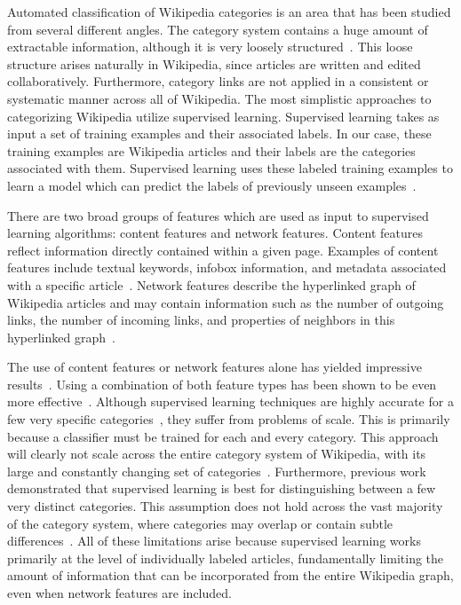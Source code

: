\documentclass[]{sig-alternate}
\begin{document}
Automated classification of Wikipedia categories is an area that has been studied from several different angles. The category system contains a huge amount of extractable information, although it is very loosely structured~\cite{Ponzetto,Strube}. This loose structure arises naturally in Wikipedia, since articles are written and edited collaboratively. Furthermore, category links are not applied in a consistent or systematic manner across all of Wikipedia. The most simplistic approaches to categorizing Wikipedia utilize supervised learning. Supervised learning takes as input a set of training examples and their associated labels. In our case, these training examples are Wikipedia articles and their labels are the categories associated with them. Supervised learning uses these labeled training examples to learn a model which can predict the labels of previously unseen examples~\cite{Szymanski}.

There are two broad groups of features which are used as input to supervised learning algorithms: content features and network features. Content features reflect information directly contained within a given page. Examples of content features include textual keywords, infobox information, and metadata associated with a specific article~\cite{Tkachenko}. Network features describe the hyperlinked graph of Wikipedia articles and may contain information such as the number of outgoing links, the number of incoming links, and properties of neighbors in this hyperlinked graph~\cite{Getoor}.

The use of content features or network features alone has yielded impressive results~\cite{Gantner, Szymanski}. Using a combination of both feature types has been shown to be even more effective~\cite{Gantner}. Although supervised learning techniques are highly accurate for a few very specific categories~\cite{Gantner, Fu, Szymanski, Tkachenko}, they suffer from problems of scale. This is primarily because a classifier must be trained for each and every category. This approach will clearly not scale across the entire category system of Wikipedia, with its large and constantly changing set of categories~\cite{Fu}. Furthermore, previous work demonstrated that supervised learning is best for distinguishing between a few very distinct categories. This assumption does not hold across the vast majority of the category system, where categories may overlap or contain subtle differences~\cite{Thornton}. All of these limitations arise because supervised learning works primarily at the level of individually labeled articles, fundamentally limiting the amount of information that can be incorporated from the entire Wikipedia graph, even when network features are included.
\end{document}
